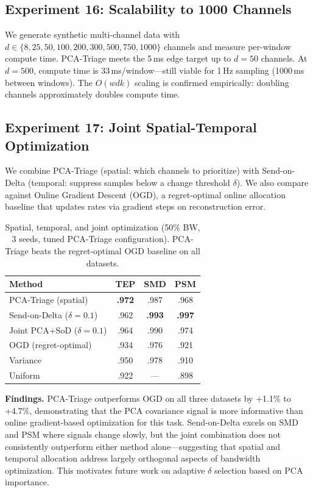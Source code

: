 \documentclass[journal]{IEEEtran}
\begin{document}
\subsection{Experiment 16: Scalability to 1000 Channels}

We generate synthetic multi-channel data with $d \in \{8, 25, 50, 100, 200, 300, 500, 750, 1000\}$ channels and measure per-window compute time. PCA-Triage meets the 5\,ms edge target up to $d{=}50$ channels. At $d{=}500$, compute time is 33\,ms/window---still viable for 1\,Hz sampling (1000\,ms between windows). The $O(wdk)$ scaling is confirmed empirically: doubling channels approximately doubles compute time.

\subsection{Experiment 17: Joint Spatial-Temporal Optimization}

We combine PCA-Triage (spatial: which channels to prioritize) with Send-on-Delta (temporal: suppress samples below a change threshold $\delta$). We also compare against Online Gradient Descent (OGD), a regret-optimal online allocation baseline that updates rates via gradient steps on reconstruction error.

\begin{table}[t]
\centering
\caption{Spatial, temporal, and joint optimization (50\% BW, 3 seeds, tuned PCA-Triage configuration). PCA-Triage beats the regret-optimal OGD baseline on all datasets.}
\begin{tabular}{@{}lccc@{}}
\toprule
\textbf{Method} & \textbf{TEP} & \textbf{SMD} & \textbf{PSM} \\
\midrule
PCA-Triage (spatial) & \textbf{.972} & .987 & .968 \\
Send-on-Delta ($\delta{=}0.1$) & .962 & \textbf{.993} & \textbf{.997} \\
Joint PCA+SoD ($\delta{=}0.1$) & .964 & .990 & .974 \\
OGD (regret-optimal) & .934 & .976 & .921 \\
Variance & .950 & .978 & .910 \\
Uniform & .922 & --- & .898 \\
\bottomrule
\end{tabular}
\label{tab:joint}
\end{table}

\textbf{Findings.} PCA-Triage outperforms OGD on all three datasets by +1.1\% to +4.7\%, demonstrating that the PCA covariance signal is more informative than online gradient-based optimization for this task. Send-on-Delta excels on SMD and PSM where signals change slowly, but the joint combination does not consistently outperform either method alone---suggesting that spatial and temporal allocation address largely orthogonal aspects of bandwidth optimization. This motivates future work on adaptive $\delta$ selection based on PCA importance.
\end{document}
